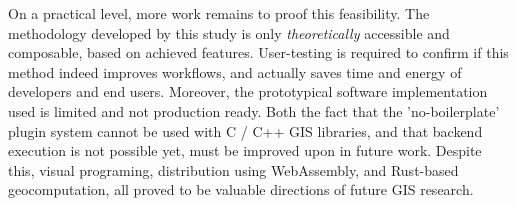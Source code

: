 On a practical level, more work remains to proof this feasibility.
The methodology developed by this study is only \emph{theoretically} accessible and composable, based on achieved features. 
User-testing is required to confirm if this method indeed improves workflows, and actually saves time and energy of developers and end users. 
Moreover, the prototypical software implementation used is limited and not production ready.
Both the fact that the 'no-boilerplate' plugin system cannot be used with C / C++ \ac{GIS} libraries, and that backend execution is not possible yet, must be improved upon in future work. Despite this, visual programing, distribution using WebAssembly, and Rust-based geocomputation, all proved to be valuable directions of future \ac{GIS} research.







